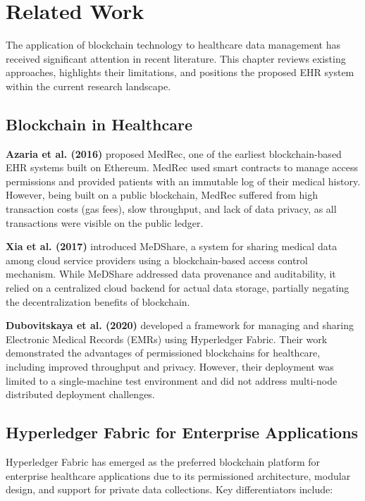 \chapter{Related Work}

The application of blockchain technology to healthcare data management has received significant attention in recent literature. This chapter reviews existing approaches, highlights their limitations, and positions the proposed EHR system within the current research landscape.

\section{Blockchain in Healthcare}

\textbf{Azaria et al. (2016)} proposed MedRec, one of the earliest blockchain-based EHR systems built on Ethereum. MedRec used smart contracts to manage access permissions and provided patients with an immutable log of their medical history. However, being built on a public blockchain, MedRec suffered from high transaction costs (gas fees), slow throughput, and lack of data privacy, as all transactions were visible on the public ledger.

\textbf{Xia et al. (2017)} introduced MeDShare, a system for sharing medical data among cloud service providers using a blockchain-based access control mechanism. While MeDShare addressed data provenance and auditability, it relied on a centralized cloud backend for actual data storage, partially negating the decentralization benefits of blockchain.

\textbf{Dubovitskaya et al. (2020)} developed a framework for managing and sharing Electronic Medical Records (EMRs) using Hyperledger Fabric. Their work demonstrated the advantages of permissioned blockchains for healthcare, including improved throughput and privacy. However, their deployment was limited to a single-machine test environment and did not address multi-node distributed deployment challenges.

\section{Hyperledger Fabric for Enterprise Applications}

Hyperledger Fabric has emerged as the preferred blockchain platform for enterprise healthcare applications due to its permissioned architecture, modular design, and support for private data collections. Key differentiators include:

